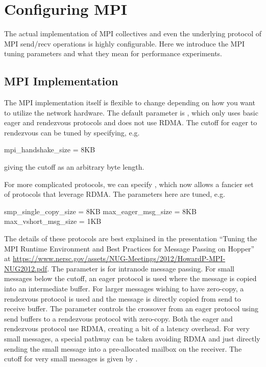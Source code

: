 
\section{Configuring MPI}
\label{sec:tutorial:mpi}

The actual implementation of MPI collectives and even the underlying protocol of MPI send/recv operations is highly configurable.
Here we introduce the MPI tuning parameters and what they mean for performance experiments.

\subsection{MPI Implementation}
\label{subsec:mpi:implementation}

The MPI implementation itself is flexible to change depending on how you want to utilize the network hardware.
The default parameter is ,
which only uses basic eager and rendezvous protocols and does not use RDMA.
The cutoff for eager to rendezvous can be tuned by specifying, e.g.

\begin{ViFile}
mpi_handshake_size = 8KB
\end{ViFile}
giving the cutoff as an arbitrary byte length.

For more complicated protocols, we can specify ,
which now allows a fancier set of protocols that leverage RDMA.
The parameters here are tuned, e.g.

\begin{ViFile}
smp_single_copy_size = 8KB
max_eager_msg_size = 8KB
max_vshort_msg_size = 1KB
\end{ViFile}

The details of these protocols are best explained in the presentation ``Tuning the MPI Runtime Environment and Best Practices for Message Passing on Hopper''
at \url{https://www.nersc.gov/assets/NUG-Meetings/2012/HowardP-MPI-NUG2012.pdf}.
The parameter  is for intranode message passing.
For small messages below the cutoff, an eager protocol is used where the message is copied into an intermediate buffer.
For larger messages wishing to have zero-copy, a rendezvous protocol is used and the message is directly copied from send to receive buffer.
The parameter  controls the crossover from an eager protocol using send buffers to a rendezvous protocol with zero-copy.
Both the eager and rendezvous protocol use RDMA, creating a bit of a latency overhead.
For very small messages, a special pathway can be taken avoiding RDMA and just directly sending the small message into a pre-allocated mailbox on the receiver.
The cutoff for very small messages is given by .

